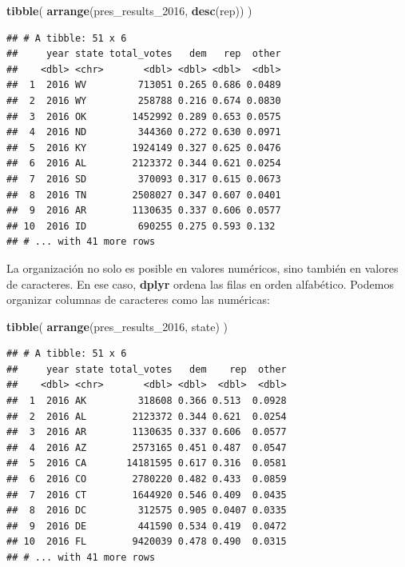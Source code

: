 \documentclass[
]{book}
\newenvironment{Shaded}{\begin{snugshade}}{\end{snugshade}}
\newcommand{\DecValTok}[1]{\textcolor[rgb]{0.00,0.00,0.81}{#1}}
\newcommand{\KeywordTok}[1]{\textcolor[rgb]{0.13,0.29,0.53}{\textbf{#1}}}
\newcommand{\NormalTok}[1]{#1}
\begin{document}
\begin{Shaded}
\begin{Highlighting}[]
\KeywordTok{tibble}\NormalTok{(}
\KeywordTok{arrange}\NormalTok{(pres_results_}\DecValTok{2016}\NormalTok{, }\KeywordTok{desc}\NormalTok{(rep))}
\NormalTok{)}
\end{Highlighting}
\end{Shaded}

\begin{verbatim}
## # A tibble: 51 x 6
##     year state total_votes   dem   rep  other
##    <dbl> <chr>       <dbl> <dbl> <dbl>  <dbl>
##  1  2016 WV         713051 0.265 0.686 0.0489
##  2  2016 WY         258788 0.216 0.674 0.0830
##  3  2016 OK        1452992 0.289 0.653 0.0575
##  4  2016 ND         344360 0.272 0.630 0.0971
##  5  2016 KY        1924149 0.327 0.625 0.0476
##  6  2016 AL        2123372 0.344 0.621 0.0254
##  7  2016 SD         370093 0.317 0.615 0.0673
##  8  2016 TN        2508027 0.347 0.607 0.0401
##  9  2016 AR        1130635 0.337 0.606 0.0577
## 10  2016 ID         690255 0.275 0.593 0.132 
## # ... with 41 more rows
\end{verbatim}

La organización no solo es posible en valores numéricos, sino también en valores de caracteres. En ese caso, \textbf{dplyr} ordena las filas en orden alfabético. Podemos organizar columnas de caracteres como las numéricas:

\begin{Shaded}
\begin{Highlighting}[]
\KeywordTok{tibble}\NormalTok{(}
\KeywordTok{arrange}\NormalTok{(pres_results_}\DecValTok{2016}\NormalTok{, state)}
\NormalTok{)}
\end{Highlighting}
\end{Shaded}

\begin{verbatim}
## # A tibble: 51 x 6
##     year state total_votes   dem    rep  other
##    <dbl> <chr>       <dbl> <dbl>  <dbl>  <dbl>
##  1  2016 AK         318608 0.366 0.513  0.0928
##  2  2016 AL        2123372 0.344 0.621  0.0254
##  3  2016 AR        1130635 0.337 0.606  0.0577
##  4  2016 AZ        2573165 0.451 0.487  0.0547
##  5  2016 CA       14181595 0.617 0.316  0.0581
##  6  2016 CO        2780220 0.482 0.433  0.0859
##  7  2016 CT        1644920 0.546 0.409  0.0435
##  8  2016 DC         312575 0.905 0.0407 0.0335
##  9  2016 DE         441590 0.534 0.419  0.0472
## 10  2016 FL        9420039 0.478 0.490  0.0315
## # ... with 41 more rows
\end{verbatim}
\end{document}
